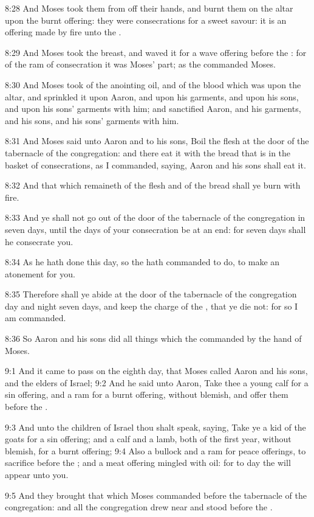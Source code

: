 8:28 And Moses took them from off their hands, and burnt them on the altar upon the burnt offering: they were consecrations for a sweet savour: it is an offering made by fire unto the \LORD.

8:29 And Moses took the breast, and waved it for a wave offering before the \LORD: for of the ram of consecration it was Moses' part; as the \LORD commanded Moses.

8:30 And Moses took of the anointing oil, and of the blood which was upon the altar, and sprinkled it upon Aaron, and upon his garments, and upon his sons, and upon his sons' garments with him; and sanctified Aaron, and his garments, and his sons, and his sons' garments with him.

8:31 And Moses said unto Aaron and to his sons, Boil the flesh at the door of the tabernacle of the congregation: and there eat it with the bread that is in the basket of consecrations, as I commanded, saying, Aaron and his sons shall eat it.

8:32 And that which remaineth of the flesh and of the bread shall ye burn with fire.

8:33 And ye shall not go out of the door of the tabernacle of the congregation in seven days, until the days of your consecration be at an end: for seven days shall he consecrate you.

8:34 As he hath done this day, so the \LORD hath commanded to do, to make an atonement for you.

8:35 Therefore shall ye abide at the door of the tabernacle of the congregation day and night seven days, and keep the charge of the \LORD, that ye die not: for so I am commanded.

8:36 So Aaron and his sons did all things which the \LORD commanded by the hand of Moses.

9:1 And it came to pass on the eighth day, that Moses called Aaron and his sons, and the elders of Israel; 9:2 And he said unto Aaron, Take thee a young calf for a sin offering, and a ram for a burnt offering, without blemish, and offer them before the \LORD.

9:3 And unto the children of Israel thou shalt speak, saying, Take ye a kid of the goats for a sin offering; and a calf and a lamb, both of the first year, without blemish, for a burnt offering; 9:4 Also a bullock and a ram for peace offerings, to sacrifice before the \LORD; and a meat offering mingled with oil: for to day the \LORD will appear unto you.

9:5 And they brought that which Moses commanded before the tabernacle of the congregation: and all the congregation drew near and stood before the \LORD.

